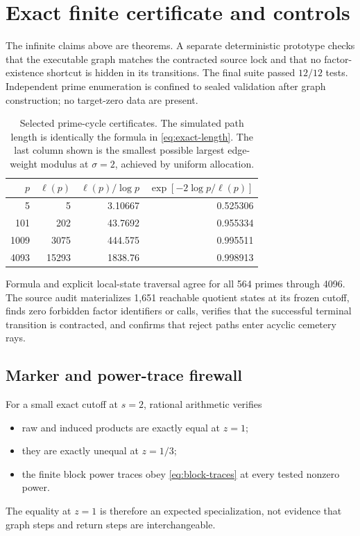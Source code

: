 \section{Exact finite certificate and controls}
\label{sec:certificate}

The infinite claims above are theorems.  A separate deterministic prototype
checks that the executable graph matches the contracted source lock and that
no factor-existence shortcut is hidden in its transitions.  The final suite
passed $12/12$ tests.  Independent prime enumeration is confined to sealed
validation after graph construction; no target-zero data are present.

\begin{table}[t]
\centering
\small
\caption{Selected prime-cycle certificates.  The simulated path length is
identically the formula in
\eqref{eq:exact-length}.  The last column shown is the smallest possible
largest edge-weight modulus at $\sigma=2$, achieved by uniform allocation.}
\label{tab:prime-certificate}
\begin{tabular}{rrrr}
\toprule
$p$ & $\ell(p)$ & $\ell(p)/\log p$ &
$\exp[-2\log p/\ell(p)]$ \\
\midrule
5    & 5     & 3.10667 & 0.525306 \\
101  & 202   & 43.7692 & 0.955334 \\
1009 & 3075  & 444.575 & 0.995511 \\
4093 & 15293 & 1838.76 & 0.998913 \\
\bottomrule
\end{tabular}
\end{table}

Formula and explicit local-state traversal agree for all 564 primes through
4096.  The source audit materializes 1,651 reachable quotient states at its
frozen cutoff, finds zero forbidden factor identifiers or calls, verifies
that the successful terminal transition is contracted, and confirms that
reject paths enter acyclic cemetery rays.

\subsection{Marker and power-trace firewall}

For a small exact cutoff at $s=2$, rational arithmetic verifies
\begin{itemize}
\item raw and induced products are exactly equal at $z=1$;
\item they are exactly unequal at $z=1/3$;
\item the finite block power traces obey
\eqref{eq:block-traces} at every tested nonzero power.
\end{itemize}
The equality at $z=1$ is therefore an expected specialization, not evidence
that graph steps and return steps are interchangeable.

